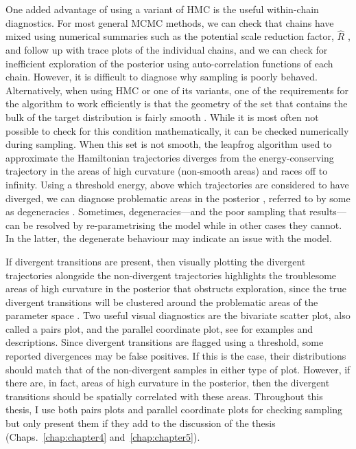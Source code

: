 One added advantage of using a variant of HMC is the useful within-chain diagnostics. For most general MCMC methods, we can check that chains have mixed using numerical summaries such as the potential scale reduction factor, $\hat{R}$ \citep{Gelman1992}, and follow up with trace plots of the individual chains, and we can check for inefficient exploration of the posterior using auto-correlation functions of each chain. However, it is difficult to diagnose why sampling is poorly behaved. Alternatively, when using HMC or one of its variants, one of the requirements for the algorithm to work efficiently is that the geometry of the set that contains the bulk of the target distribution is fairly smooth \citep{gabry_vis_2019}. While it is most often not possible to check for this condition mathematically, it can be checked numerically during sampling. When this set is not smooth, the leapfrog algorithm used to approximate the Hamiltonian trajectories diverges from the energy-conserving trajectory in the areas of high curvature (non-smooth areas) and races off to infinity. Using a threshold energy, above which trajectories are considered to have diverged, we can diagnose problematic areas in the posterior \citep{gabry_vis_2019}, referred to by some as degeneracies \citep{betancourt_2020}. Sometimes, degeneracies---and the poor sampling that results---can be resolved by re-parametrising the model \citep{betancourt2015} while in other cases they cannot. In the latter, the degenerate behaviour may indicate an issue with the model.

If divergent transitions are present, then visually plotting the divergent trajectories alongside the non-divergent trajectories highlights the troublesome areas of high curvature in the posterior that obstructs exploration, since the true divergent transitions will be clustered around the problematic areas of the parameter space \citep{gabry_vis_2019}. Two useful visual diagnostics are the bivariate scatter plot, also called a pairs plot, and the parallel coordinate plot, see \citep{gabry_vis_2019} for examples and descriptions. Since divergent transitions are flagged using a threshold, some reported divergences may be false positives. If this is the case, their distributions should match that of the non-divergent samples in either type of plot. However, if there are, in fact, areas of high curvature in the posterior, then the divergent transitions should be spatially correlated with these areas. Throughout this thesis, I use both pairs plots and parallel coordinate plots for checking sampling but only present them if they add to the discussion of the thesis (Chaps.~\ref{chap:chapter4} and~\ref{chap:chapter5}).

